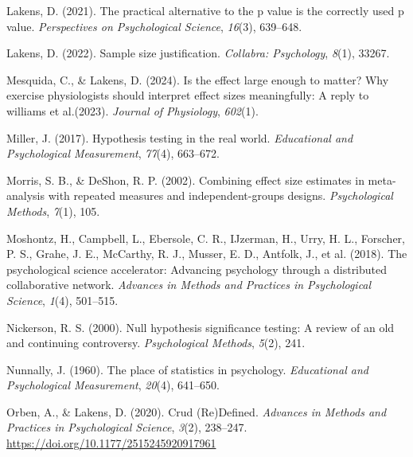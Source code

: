 \documentclass[
  man,floatsintext]{apa7}
\newlength{\cslhangindent}
\newlength{\cslentryspacingunit} %
\newenvironment{CSLReferences}[2] %
 {%
  \setlength{\parindent}{0pt}
  \ifodd #1
  \let\oldpar\par
  \def\par{\hangindent=\cslhangindent\oldpar}
  \fi
  \setlength{\parskip}{#2\cslentryspacingunit}
 }%
 {}
\begin{document}
\begin{CSLReferences}{1}{0}
\leavevmode{}%
Lakens, D. (2021). The practical alternative to the p value is the correctly used p value. \emph{Perspectives on Psychological Science}, \emph{16}(3), 639--648.

\leavevmode{}%
Lakens, D. (2022). Sample size justification. \emph{Collabra: Psychology}, \emph{8}(1), 33267.

\leavevmode{}%
Mesquida, C., \& Lakens, D. (2024). Is the effect large enough to matter? Why exercise physiologists should interpret effect sizes meaningfully: A reply to williams et al.(2023). \emph{Journal of Physiology}, \emph{602}(1).

\leavevmode{}%
Miller, J. (2017). Hypothesis testing in the real world. \emph{Educational and Psychological Measurement}, \emph{77}(4), 663--672.

\leavevmode{}%
Morris, S. B., \& DeShon, R. P. (2002). Combining effect size estimates in meta-analysis with repeated measures and independent-groups designs. \emph{Psychological Methods}, \emph{7}(1), 105.

\leavevmode{}%
Moshontz, H., Campbell, L., Ebersole, C. R., IJzerman, H., Urry, H. L., Forscher, P. S., Grahe, J. E., McCarthy, R. J., Musser, E. D., Antfolk, J., et al. (2018). The psychological science accelerator: Advancing psychology through a distributed collaborative network. \emph{Advances in Methods and Practices in Psychological Science}, \emph{1}(4), 501--515.

\leavevmode{}%
Nickerson, R. S. (2000). Null hypothesis significance testing: A review of an old and continuing controversy. \emph{Psychological Methods}, \emph{5}(2), 241.

\leavevmode{}%
Nunnally, J. (1960). The place of statistics in psychology. \emph{Educational and Psychological Measurement}, \emph{20}(4), 641--650.

\leavevmode{}%
Orben, A., \& Lakens, D. (2020). Crud ({Re}){Defined}. \emph{Advances in Methods and Practices in Psychological Science}, \emph{3}(2), 238--247. \url{https://doi.org/10.1177/2515245920917961}


\end{CSLReferences}
\end{document}
